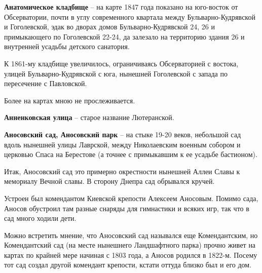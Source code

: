 \medskip


\textbf{Анатомическое кладбище} – на карте 
1847 года показано на юго-восток от Обсерватории, почти в углу современного квартала между Бульварно-Кудрявской и Гоголевской, эдак во дворах домов Бульвар\-но-Кудрявской 24, 26 и примыкающего по Гоголевской 22-24, да залезало на территорию здания 26 и внутренней усадьбы детского санатория.

К 1861-му кладбище увеличилось, ограничиваясь Обсерваторией с востока, улицей Бульвар\-но-Кудрявской с юга, нынешней Гоголевской с запада по пересечение с Павловской.

Более на картах мною не прослеживается.\\

\medskip

\textbf{Анненковская улица} – старое название Лютеранской.\\

\medskip


\textbf{Аносовский сад, Аносовский парк} – на стыке 19-20 веков, небольшой сад вдоль нынешней улицы Лаврской, между Николаевским военным собором и церковью Спаса на Берестове (а точнее с примыкавшим к ее усадьбе бастионом).

Итак, Аносовский сад это примерно окрестности нынешней Аллеи Славы к мемориалу Вечной славы. В сторону Днепра сад обрывался кручей.

Устроен был комендантом Киевской крепости Алексеем Аносовым. Помимо сада, Аносов обустроил там разные снаряды для гимнастики и всяких игр, так что в сад много ходили дети.

Можно встретить мнение, что Аносовский сад назывался еще Комендантским, но Комендантский сад (на месте нынешнего Ландшафтного парка) прочно живет на картах по крайней мере начиная с 1803 года, а Аносов родился в 1822-м. Посему тот сад создал другой комендант крепости, кстати оттуда близко был и его дом.\\ 



